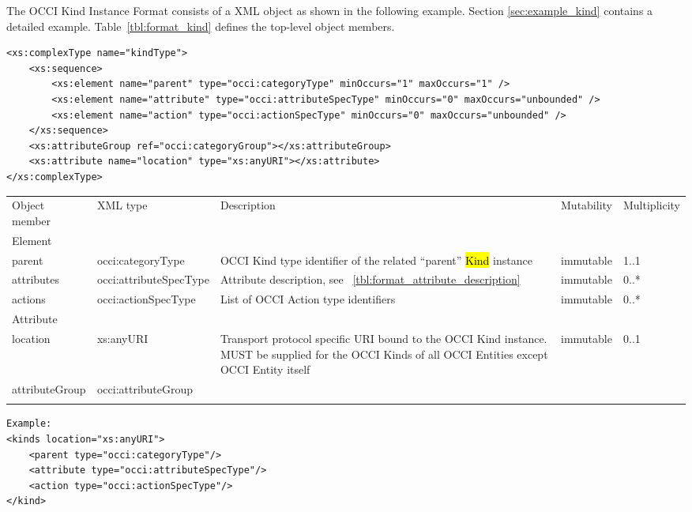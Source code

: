 \documentclass[10pt,a4paper]{article}
\begin{document}
The OCCI Kind Instance Format consists of a XML object as shown in the
following example. Section \ref{sec:example_kind} contains a detailed example.
Table~\ref{tbl:format_kind} defines the top-level object members.
\begin{lstlisting}
<xs:complexType name="kindType">
	<xs:sequence>
		<xs:element name="parent" type="occi:categoryType" minOccurs="1" maxOccurs="1" />
		<xs:element name="attribute" type="occi:attributeSpecType" minOccurs="0" maxOccurs="unbounded" />
		<xs:element name="action" type="occi:actionSpecType" minOccurs="0" maxOccurs="unbounded" />
	</xs:sequence>
	<xs:attributeGroup ref="occi:categoryGroup"></xs:attributeGroup>
	<xs:attribute name="location" type="xs:anyURI"></xs:attribute>
</xs:complexType>
\end{lstlisting}

 {
    \begin{tabularx}{\textwidth}{llXll}
    \toprule
    Object member & XML type & Description & Mutability & Multiplicity \\
    \colrule
    Element \\
    parent & occi:categoryType & OCCI Kind type identifier of the
related ``parent'' \hl{Kind} instance & immutable & 1..1 \\

    attributes & occi:attributeSpecType & Attribute description, see
~\ref{tbl:format_attribute_description} & immutable & 0..* \\

    actions & occi:actionSpecType & List of OCCI Action type
identifiers & immutable & 0..* \\

    Attribute\\
    location & xs:anyURI & Transport protocol specific URI bound to the OCCI Kind
instance. MUST be supplied for the OCCI Kinds of all OCCI Entities except OCCI
Entity itself & immutable & 0..1 \\
   
    attributeGroup & occi:attributeGroup & & & \\
    \botrule
    \end{tabularx}
}
\begin{lstlisting}
Example:
<kinds location="xs:anyURI">
	<parent type="occi:categoryType"/>
	<attribute type="occi:attributeSpecType"/>
	<action type="occi:actionSpecType"/>
</kind>
\end{lstlisting}
\end{document}
